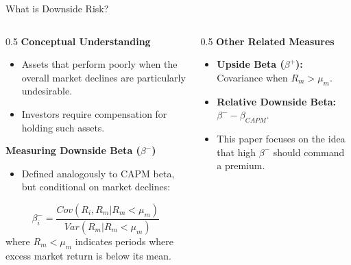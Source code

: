 \documentclass[10pt]{beamer}
\begin{document}
\begin{frame}{What is Downside Risk?}
    \begin{columns}[T] %
        \begin{column}{0.5\textwidth}
            \textbf{Conceptual Understanding}
            \begin{itemize}
                \item Assets that perform poorly when the overall market declines are particularly undesirable.
                \item Investors require compensation for holding such assets.
            \end{itemize}
            \vspace{1em}
            \textbf{Measuring Downside Beta ($\beta^{-}$)}
            \begin{itemize}
                \item Defined analogously to CAPM beta, but conditional on market declines:
                \end{itemize}
                $$
 \beta_i^{-} = \frac{Cov(R_i, R_m | R_m < \mu_m)}{Var(R_m | R_m < \mu_m)} 
$$
                 where $R_m < \mu_m$ indicates periods where excess market return is below its mean.
        \end{column}
        \begin{column}{0.5\textwidth}
            \textbf{Other Related Measures}
            \begin{itemize}
                \item \textbf{Upside Beta ($\beta^{+}$):} Covariance when $R_m > \mu_m$.
                \item \textbf{Relative Downside Beta:} $\beta^{-} - \beta_{CAPM}$.
                \item This paper focuses on the idea that high $\beta^{-}$ should command a premium.
            \end{itemize}
        \end{column}
    \end{columns}
\end{frame}
\end{document}
